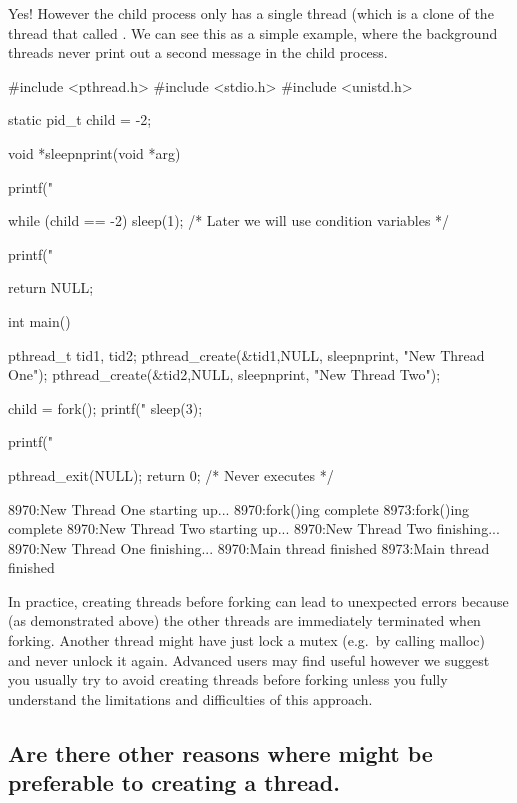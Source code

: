 Yes! However the child process only has a single thread (which is a clone of the thread that called . We can see this as a simple example, where the background threads never print out a second message in the child process.

\begin{code}[language=C]
#include <pthread.h>
#include <stdio.h>
#include <unistd.h>

static pid_t child = -2;

void *sleepnprint(void *arg) {
  printf("%

  while (child == -2) {sleep(1);} /* Later we will use condition variables */

  printf("%

  return NULL;  
}
int main() {
  pthread_t tid1, tid2;
  pthread_create(&tid1,NULL, sleepnprint, "New Thread One");
  pthread_create(&tid2,NULL, sleepnprint, "New Thread Two");
  
  child = fork();
  printf("%
  sleep(3);
    
  printf("%
  
  pthread_exit(NULL);
  return 0; /* Never executes */
}
\end{code}

\begin{code}
8970:New Thread One starting up...
8970:fork()ing complete
8973:fork()ing complete
8970:New Thread Two starting up...
8970:New Thread Two finishing...
8970:New Thread One finishing...
8970:Main thread finished
8973:Main thread finished
\end{code}

In practice, creating threads before forking can lead to unexpected errors because (as demonstrated above) the other threads are immediately terminated when forking. Another thread might have just lock a mutex (e.g.~by calling malloc) and never unlock it again. Advanced users may find  useful however we suggest you usually try to avoid creating threads before forking unless you fully understand the limitations and difficulties of this approach.

\subsection{\texorpdfstring{Are there other reasons where  might be preferable to creating a thread.}{Are there other reasons where fork might be preferable to creating a thread.}}\label{are-there-other-reasons-where-fork-might-be-preferable-to-creating-a-thread.}

